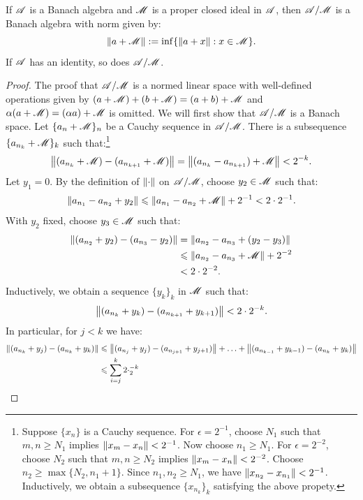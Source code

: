 \documentclass[reqno]{amsart}
\begin{document}
\begin{theorem}
	If $\mathscr{A}$ is a Banach algebra and $\mathscr{M}$ is a proper closed ideal in $\mathscr{A}$, then $\mathscr{A}/\mathscr{M}$ is a Banach algebra with norm given by:
	\[
		\left\lVert a + \mathscr{M} \right\rVert := \inf \{\left\lVert a + x \right\rVert : x \in \mathscr{M}\}.
	\] 
	If $\mathscr{A}$ has an identity, so does $\mathscr{A}/\mathscr{M}$.
\end{theorem}
	\begin{proof}
		The proof that $\mathscr{A}/\mathscr{M}$ is a normed linear space with well-defined operations given by $(a+\mathscr{M}) + (b+\mathscr{M}) = (a+b) + \mathscr{M}$ and $\alpha(a+\mathscr{M}) = (\alpha a) + \mathscr{M}$ is omitted. We will first show that $\mathscr{A}/\mathscr{M}$ is a Banach space. Let $\{a_n + \mathscr{M}\}_n$ be a Cauchy sequence in $\mathscr{A}/\mathscr{M}$. There is a subsequence $\{a_{n_k} + \mathscr{M}\}_k$ such that:\footnote{Suppose $\{x_n\}$ is a Cauchy sequence. For $\epsilon = 2^{-1}$, choose $N_1$ such that $m,n \geq N_1$ implies $\left\lVert x_m - x_n \right\rVert < 2^{-1}$. Now choose $n_1 \geq N_1$. For $\epsilon = 2^{-2}$, choose $N_2$ such that $m,n \geq N_2$ implies $\left\lVert x_m - x_n \right\rVert < 2^{-2}$. Choose $n_2 \geq \max \{N_2, n_1 + 1\}$. Since $n_1, n_2 \geq N_1$, we have $\left\lVert x_{n_2} - x_{n_1} \right\rVert < 2^{-1}$. Inductively, we obtain a subsequence $\{x_{n_k}\}_k$ satisfying the above propety. }
		\[
			\left\lVert (a_{n_k} + \mathscr{M}) - (a_{n_{k+1}} + \mathscr{M})\right\rVert = \left\lVert (a_{n_k} - a_{n_{k+1}}) + \mathscr{M} \right\rVert < 2^{-k}.	
		\] 
		Let $y_1 = 0$. By the definition of $\left\lVert \cdot \right\rVert$ on $\mathscr{A}/\mathscr{M}$, choose $y_2 \in \mathscr{M}$ such that:
		\[
			\left\lVert a_{n_1} - a_{n_2} + y_2 \right\rVert \leqslant \left\lVert a_{n_1} - a_{n_2} + \mathscr{M} \right\rVert + 2^{-1} < 2 \cdot 2^{-1}.
		\] 
		With $y_2$ fixed, choose $y_3 \in \mathscr{M}$ such that:
		\begin{align*}
			\left\lVert (a_{n_2} + y_2) - (a_{n_3} - y_2) \right\rVert
			&= \left\lVert a_{n_2} - a_{n_3} + (y_2 - y_3) \right\rVert \\
			&\leqslant \left\lVert a_{n_2} - a_{n_3} + \mathscr{M} \right\rVert + 2^{-2}  \\
			&< 2 \cdot 2^{-2}.
		\end{align*}
		Inductively, we obtain a sequence $\{y_k\}_k$ in $\mathscr{M}$ such that:
		\[
			\left\lVert (a_{n_k} + y_k) - (a_{n_{k+1}} + y_{k+1}) \right\rVert < 2 \cdot 2^{-k}.
		\] 
		In particular, for $j < k$ we have:
		\begin{align*}
			\lnorm (a_{n_k} + y_j) - (a_{n_k} + y_k) \rnorm
			&\leq \lnorm (a_{n_j} + y_j)-(a_{n_{j+1}} + y_{j+1}) \rnorm + \ldots +\lnorm (a_{n_{k-1}} + y_{k-1}) - (a_{n_k} + y_k) \rnorm  \\
			&\leq \sum_{i=j}^{k} 2\cdot_2^{-k}  \\

\end{align*}
\end{proof}
\end{document}
